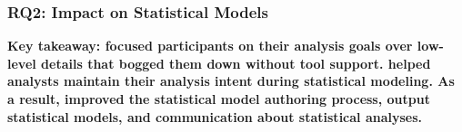 
\subsubsection{RQ2: \rTisanes Impact on Statistical Models}
\textbf{Key takeaway: 
\rTisane focused participants on their analysis goals over low-level details
that bogged them down without tool support. 
\rTisane helped analysts maintain their analysis intent during statistical modeling.
As a result, \rTisane improved the
statistical model authoring process, output statistical models, and
communication about statistical analyses. 
}

